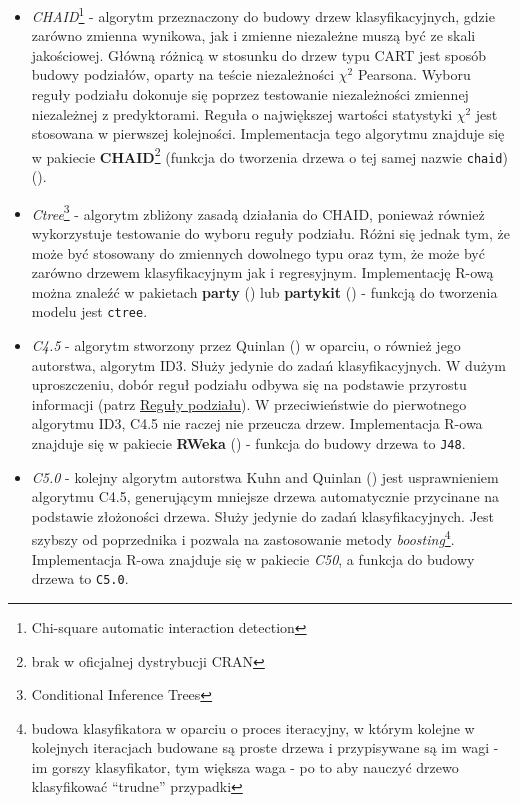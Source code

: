 \documentclass[
]{book}
\providecommand{\tightlist}{%
  \setlength{\itemsep}{0pt}\setlength{\parskip}{0pt}}
\theoremstyle{plain}
\theoremstyle{definition}
\theoremstyle{definition}
\theoremstyle{definition}
\theoremstyle{definition}
\theoremstyle{definition}
\theoremstyle{remark}
\begin{document}
\begin{itemize}
\tightlist
\item
  \emph{CHAID}\footnote{Chi-square automatic interaction detection} - algorytm przeznaczony do budowy drzew klasyfikacyjnych, gdzie zarówno zmienna wynikowa, jak i zmienne niezależne muszą być ze skali jakościowej. Główną różnicą w stosunku do drzew typu CART jest sposób budowy podziałów, oparty na teście niezależności \(\chi^2\) Pearsona. Wyboru reguły podziału dokonuje się poprzez testowanie niezależności zmiennej niezależnej z predyktorami. Reguła o największej wartości statystyki \(\chi^2\) jest stosowana w pierwszej kolejności. Implementacja tego algorytmu znajduje się w pakiecie \textbf{CHAID}\footnote{brak w oficjalnej dystrybucji CRAN} (funkcja do tworzenia drzewa o tej samej nazwie \texttt{chaid}) ().
\item
  \emph{Ctree}\footnote{Conditional Inference Trees} - algorytm zbliżony zasadą działania do CHAID, ponieważ również wykorzystuje testowanie do wyboru reguły podziału. Różni się jednak tym, że może być stosowany do zmiennych dowolnego typu oraz tym, że może być zarówno drzewem klasyfikacyjnym jak i regresyjnym. Implementację R-ową można znaleźć w pakietach \textbf{party} () lub \textbf{partykit} () - funkcją do tworzenia modelu jest \texttt{ctree}.
\item
  \emph{C4.5} - algorytm stworzony przez Quinlan () w oparciu, o również jego autorstwa, algorytm ID3. Służy jedynie do zadań klasyfikacyjnych. W dużym uproszczeniu, dobór reguł podziału odbywa się na podstawie przyrostu informacji (patrz \hyperref[reguux142y-podziaux142u]{Reguły podziału}). W przeciwieństwie do pierwotnego algorytmu ID3, C4.5 nie raczej nie przeucza drzew. Implementacja R-owa znajduje się w pakiecie \textbf{RWeka} () - funkcja do budowy drzewa to \texttt{J48}.
\item
  \emph{C5.0} - kolejny algorytm autorstwa Kuhn and Quinlan () jest usprawnieniem algorytmu C4.5, generującym mniejsze drzewa automatycznie przycinane na podstawie złożoności drzewa. Służy jedynie do zadań klasyfikacyjnych. Jest szybszy od poprzednika i pozwala na zastosowanie metody \emph{boosting}\footnote{budowa klasyfikatora w oparciu o proces iteracyjny, w którym kolejne w kolejnych iteracjach budowane są proste drzewa i przypisywane są im wagi - im gorszy klasyfikator, tym większa waga - po to aby nauczyć drzewo klasyfikować ``trudne'' przypadki}. Implementacja R-owa znajduje się w pakiecie \emph{C50}, a funkcja do budowy drzewa to \texttt{C5.0}.
\end{itemize}
\end{document}
